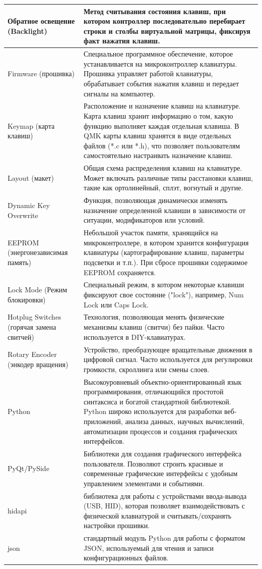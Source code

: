 \begin{xltabular}{\textwidth}{|p{3.6cm}|X|}
	Обратное освещение (Backlight) & Метод считывания состояния клавиш, при котором контроллер последовательно перебирает строки и столбы виртуальной матрицы, фиксируя факт нажатия клавиш. \\ \hline
	Firmware (прошивка) & Специальное программное обеспечение, которое устанавливается на микроконтроллер клавиатуры. Прошивка управляет работой клавиатуры, обрабатывает события нажатия клавиш и передает сигналы на компьютер. \\ \hline
	Keymap (карта клавиш) & Расположение и назначение клавиш на клавиатуре. Карта клавиш хранит информацию о том, какую функцию выполняет каждая отдельная клавиша. В QMK карты клавиш хранятся в виде отдельных файлов (*.c или *.h), что позволяет пользователям самостоятельно настраивать назначение клавиш. \\ \hline
	Layout (макет) & Общая схема распределения клавиш на клавиатуре. Может включать различные типы расстановки клавиш, такие как ортолинейный, сплэт, вогнутый и другие. \\ \hline
	Dynamic Key Overwrite & Функция, позволяющая динамически изменять назначение определенной клавиши в зависимости от ситуации, модификаторов или условий. \\ \hline
	EEPROM (энергонезависимая память) & Небольшой участок памяти, хранящийся на микроконтроллере, в котором хранится конфигурация клавиатуры (картографирование клавиш, параметры подсветки и т.п.). При сбросе прошивки содержимое EEPROM сохраняется. \\ \hline
	Lock Mode (Режим блокировки) & Специальный режим, в котором некоторые клавиши фиксируют свое состояние ("lock"), например, Num Lock или Caps Lock. \\ \hline
	Hotplug Switches (горячая замена свитчей) & Технология, позволяющая менять физические механизмы клавиш (свитчи) без пайки. Часто используется в DIY-клавиатурах. \\ \hline
	Rotary Encoder (энкодер вращения) & Устройство, преобразующее вращательные движения в цифровой сигнал. Часто используется для регулировки громкости, скроллинга или смены слоев. \\ \hline
	Python & Высокоуровневый объектно-ориентированный язык программирования, отличающийся простотой синтаксиса и богатой стандартной библиотекой. Python широко используется для разработки веб-приложений, анализа данных, научных вычислений, автоматизации процессов и создания графических интерфейсов. \\ \hline
	PyQt/PySide & Библиотеки для создания графического интерфейса пользователя. Позволяют строить красивые и современные графические интерфейсы с удобным управлением элементами и событиями. \\ \hline
	hidapi & библиотека для работы с устройствами ввода-вывода (USB, HID), которая позволяет взаимодействовать с физической клавиатурой и считывать/сохранять настройки прошивки. \\ \hline
	json & стандартный модуль Python для работы с форматом JSON, используемый для чтения и записи конфигурационных файлов.
\end{xltabular}
\renewcommand{\arraystretch}{1.0} %

